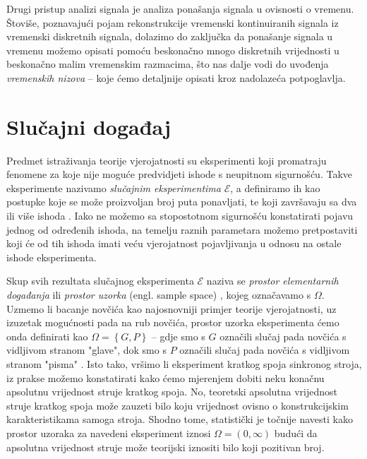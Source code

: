 \documentclass[a4paper,12pt,oneside]{memoir}
\begin{document}
        
        Drugi pristup analizi signala je analiza ponašanja signala u ovisnosti o vremenu. Štoviše, poznavajući pojam rekonstrukcije vremenski kontinuiranih signala iz vremenski diskretnih signala, dolazimo do zaključka da ponašanje signala u vremenu možemo opisati pomoću beskonačno mnogo diskretnih vrijednosti u beskonačno malim vremenskim razmacima, što nas dalje vodi do uvođenja \textit{vremenskih nizova} -- koje ćemo detaljnije opisati kroz nadolazeća potpoglavlja.



        \section{Slučajni događaj}
            
            Predmet istraživanja teorije vjerojatnosti su eksperimenti koji promatraju fenomene za koje nije moguće predvidjeti ishode s neupitnom sigurnošću. Takve eksperimente nazivamo \textit{slučajnim eksperimentima} $\mathscr{E}$, a definiramo ih kao postupke koje se može proizvoljan broj puta ponavljati, te koji završavaju sa dva ili više ishoda \cite{Bahovec}. Iako ne možemo sa stopostotnom sigurnošću konstatirati pojavu jednog od određenih ishoda, na temelju raznih parametara možemo pretpostaviti koji će od tih ishoda imati veću vjerojatnost pojavljivanja u odnosu na ostale ishode eksperimenta.

            Skup svih rezultata slučajnog eksperimenta $\mathscr{E}$ naziva se \textit{prostor elementarnih događanja} ili \textit{prostor uzorka} (engl. sample space) \cite{Bahovec}, kojeg označavamo s $\Omega$. Uzmemo li bacanje novčića kao najosnovniji primjer teorije vjerojatnosti, uz izuzetak mogućnosti pada na rub novčića, prostor uzorka eksperimenta ćemo onda definirati kao $\Omega=\left\{G,P\right\}$ -- gdje smo s $G$ označili slučaj pada novčića s vidljivom stranom "glave", dok smo s $P$ označili slučaj pada novčića s vidljivom stranom "pisma" \cite{Dekking}. Isto tako, vršimo li eksperiment kratkog spoja sinkronog stroja, iz prakse možemo konstatirati kako ćemo mjerenjem dobiti neku konačnu apsolutnu vrijednost struje kratkog spoja. No, teoretski apsolutna vrijednost struje kratkog spoja može zauzeti bilo koju vrijednost ovisno o konstrukcijskim karakteristikama samoga stroja. Shodno tome, statistički je točnije navesti kako prostor uzoraka za navedeni eksperiment iznosi $\Omega=(0,\infty)$ budući da apsolutna vrijednost struje može teorijski iznositi bilo koji pozitivan broj.
\end{document}
